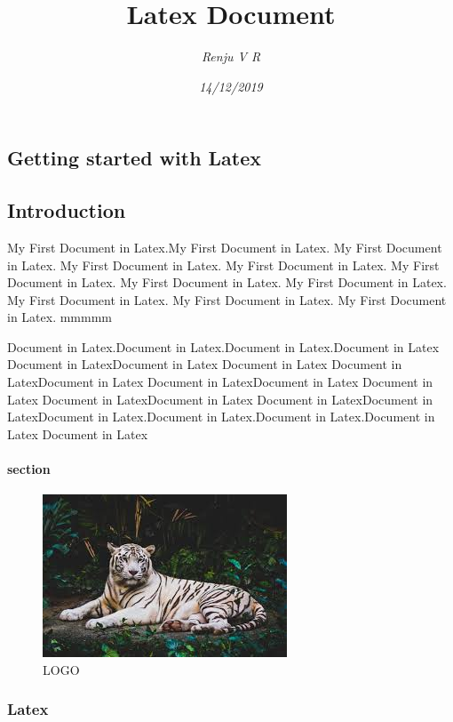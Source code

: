 \documentclass[12pt]{report} %
\begin{document}

\title{\textbf{Latex Document}}
\author{\textit{Renju V R}}
\date{\textit{14/12/2019}}
\maketitle
\begin{multicols}{2}

\chapter{Getting started with Latex }
\section{Introduction}
My First Document in Latex.My First Document in Latex. My First Document in Latex. My First Document in Latex. My First Document in Latex. My First Document in Latex. My First Document in Latex. My First Document in Latex. My First Document in Latex. My First Document in Latex. My First Document in Latex.  mmmmm

Document in Latex.Document in Latex.Document in Latex.Document in Latex Document in LatexDocument in Latex Document in Latex Document in LatexDocument in Latex Document in LatexDocument in Latex Document in Latex Document in LatexDocument in Latex Document in LatexDocument in LatexDocument in Latex.Document in Latex.Document in Latex.Document in Latex Document in Latex
\subsubsection{section}
\begin{figure}[H]
\centering
\includegraphics{index.jpeg}
\caption{LOGO}
\end{figure}
\subsection{Latex}




\end{multicols}
\end{document}
